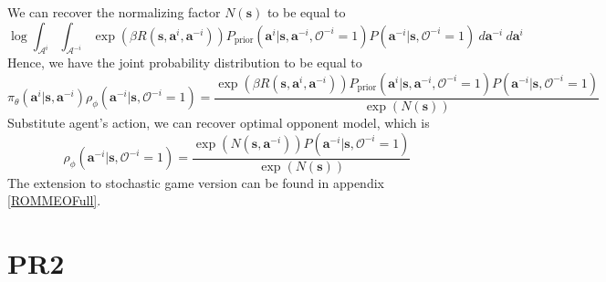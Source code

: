 We can recover the normalizing factor $N(\boldsymbol{s})$ to be equal to 
\begin{equation}
    \log \int_{\mathcal{A}^i} \int_{\mathcal{A}^{-i}} \exp\left(\beta R(\boldsymbol{s}, \boldsymbol{a}^i, \boldsymbol{a}^{-i})\right)P_{\text{prior}}(\boldsymbol{a}^i | \boldsymbol{s}, \boldsymbol{a}^{-i}, \mathcal{O}^{-i} = 1)P(\boldsymbol{a}^{-i} |\boldsymbol{s}, \mathcal{O}^{-i} = 1) \  d\boldsymbol{a}^{-i} \ d\boldsymbol{a}^i
\end{equation}
Hence, we have the joint probability distribution to be equal to 
\begin{equation}
    \pi_{\theta}(\boldsymbol{a}^i | \boldsymbol{s}, \boldsymbol{a}^{-i}) \rho_{\phi}(\boldsymbol{a}^{-i} | \boldsymbol{s}, \mathcal{O}^{-i} = 1) = \frac{\exp\left(\beta R(\boldsymbol{s}, \boldsymbol{a}^i, \boldsymbol{a}^{-i})\right)P_{\text{prior}}(\boldsymbol{a}^i | \boldsymbol{s}, \boldsymbol{a}^{-i}, \mathcal{O}^{-i} = 1)P(\boldsymbol{a}^{-i} |\boldsymbol{s}, \mathcal{O}^{-i} = 1)}{\exp (N(\boldsymbol{s}))}
\end{equation}
Substitute agent's action, we can recover optimal opponent model, which is 
\begin{equation}
    \rho_{\phi}(\boldsymbol{a}^{-i} | \boldsymbol{s}, \mathcal{O}^{-i} = 1) = \frac{\exp (N(\boldsymbol{s}, \boldsymbol{a}^{-i})) P(\boldsymbol{a}^{-i} |\boldsymbol{s}, \mathcal{O}^{-i} = 1)}{\exp (N(\boldsymbol{s}))}
\end{equation}
The extension to stochastic game version can be found in appendix \ref{ROMMEOFull}.

\section{PR2 \cite{wen2019probabilistic}}

